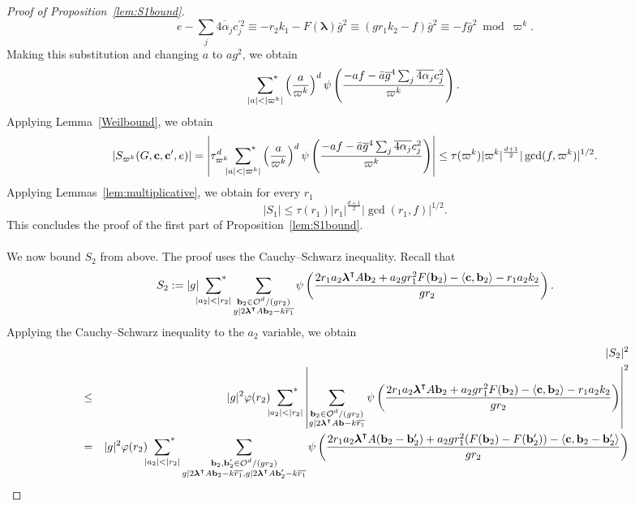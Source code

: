 \documentclass[10pt]{amsart}
\theoremstyle{plain}
\theoremstyle{plain}
\renewcommand{\vec}[1]{\mathbf{#1}}
\theoremstyle{remark}
\theoremstyle{definition}
\newcommand{\sumstar}{\sideset{}{^*}\sum}
\begin{document}
\begin{proof}[Proof of Proposition~\ref{lem:S1bound}]
\[e-\sum_{j}\overline{4\alpha_j}c_j^{\prime 2}\equiv -r_2k_1-F(\boldsymbol{\lambda})\bar{g}^2\equiv (gr_1k_2-f)\bar{g}^2\equiv -f\bar{g}^2\bmod \varpi^k.\]
Making this substitution and changing $a$ to $ag^2$, we obtain
\[\sumstar_{|a|<|\varpi^k|} \left(\frac{a}{\varpi^k} \right)^d \psi\left(\frac{-af-\bar{a}\overline{g}^4\sum_{j}\overline{4\alpha_j}c_j^2}{\varpi^k}  \right).\]
Applying Lemma~\ref{Weilbound}, we obtain
\[|S_{\varpi^k}(G,\vec{c},\vec{c}',e)|=\left|\tau_{\varpi^k}^d\sumstar_{|a|<|\varpi^k|} \left(\frac{a}{\varpi^k} \right)^d \psi\left(\frac{-af-\bar{a}\overline{g}^4\sum_{j}\overline{4\alpha_j}c_j^2}{\varpi^k}  \right)\right|\leq \tau(\varpi^k)|\varpi^k|^{\frac{d+1}{2}}|\gcd(f,\varpi^k)|^{1/2}.\]
Applying Lemmas~\ref{lem:multiplicative}, we obtain for every $r_1$
\[|S_1|\leq \tau(r_1)|r_1|^{\frac{d+1}{2}}|\gcd(r_1,f)|^{1/2}.\]
This concludes the proof of the first part of Proposition~\ref{lem:S1bound}.
\\
\\
 We now bound $S_2$ from above. The proof uses the Cauchy--Schwarz inequality. Recall that
\[S_2:=|g|\sumstar_{|a_2|<|r_2|}\sum_{\substack{\vec{b}_2\in \mathcal{O}^d/(gr_2)\\ g|2\boldsymbol{\lambda}^{\intercal}A\vec{b}_2-k\overline{r_1}}}  \psi\left(\frac{2r_1a_2\boldsymbol{\lambda}^{\intercal}A\vec{b}_2+a_2gr_1^2F(\vec{b}_2)-\left<\vec{c},\vec{b}_2\right>-r_1a_2k_2}{gr_2}\right).\]
Applying the Cauchy--Schwarz inequality to the $a_2$ variable, we obtain
\begin{eqnarray*}
&&|S_2|^2\\&\leq& |g|^2\varphi(r_2)\sumstar_{|a_2|<|r_2|}\left|\sum_{\substack{\vec{b}_2\in \mathcal{O}^d/(gr_2)\\ g|2\boldsymbol{\lambda}^{\intercal}A\vec{b}-k\overline{r_1}}}  \psi\left(\frac{2r_1a_2\boldsymbol{\lambda}^{\intercal}A\vec{b}_2+a_2gr_1^2F(\vec{b}_2)-\left<\vec{c},\vec{b}_2\right>-r_1a_2k_2}{gr_2}\right)\right|^2\\ &=& |g|^2\varphi(r_2)\sumstar_{|a_2|<|r_2|}\sum_{\substack{\vec{b}_2,\vec{b}_2'\in \mathcal{O}^d/(gr_2)\\ g|2\boldsymbol{\lambda}^{\intercal}A\vec{b}_2-k\overline{r_1}, g|2\boldsymbol{\lambda}^{\intercal}A\vec{b}_2'-k\overline{r_1}}}  \psi\left(\frac{2r_1a_2\boldsymbol{\lambda}^{\intercal}A(\vec{b}_2-\vec{b}_2')+a_2gr_1^2(F(\vec{b}_2)-F(\vec{b}_2'))-\left<\vec{c},\vec{b}_2-\vec{b}_2'\right>}{gr_2}\right)

\end{eqnarray*}
\end{proof}
\end{document}
